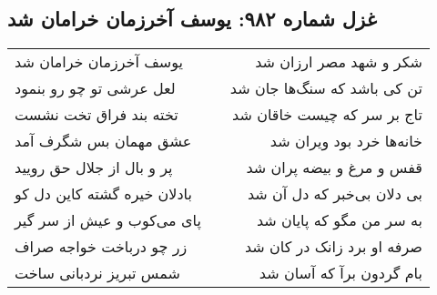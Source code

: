 \begin{center}
\section*{غزل شماره ۹۸۲: یوسف آخرزمان خرامان شد}
\label{sec:0982}
\begin{longtable}{l p{0.5cm} r}
یوسف آخرزمان خرامان شد
&&
شکر و شهد مصر ارزان شد
\\
لعل عرشی تو چو رو بنمود
&&
تن کی باشد که سنگ‌ها جان شد
\\
تخته بند فراق تخت نشست
&&
تاج بر سر که چیست خاقان شد
\\
عشق مهمان بس شگرف آمد
&&
خانه‌ها خرد بود ویران شد
\\
پر و بال از جلال حق رویید
&&
قفس و مرغ و بیضه پران شد
\\
بادلان خیره گشته کاین دل کو
&&
بی دلان بی‌خبر که دل آن شد
\\
پای می‌کوب و عیش از سر گیر
&&
به سر من مگو که پایان شد
\\
زر چو درباخت خواجه صراف
&&
صرفه او برد زانک در کان شد
\\
شمس تبریز نردبانی ساخت
&&
بام گردون برآ که آسان شد
\\
\end{longtable}
\end{center}
